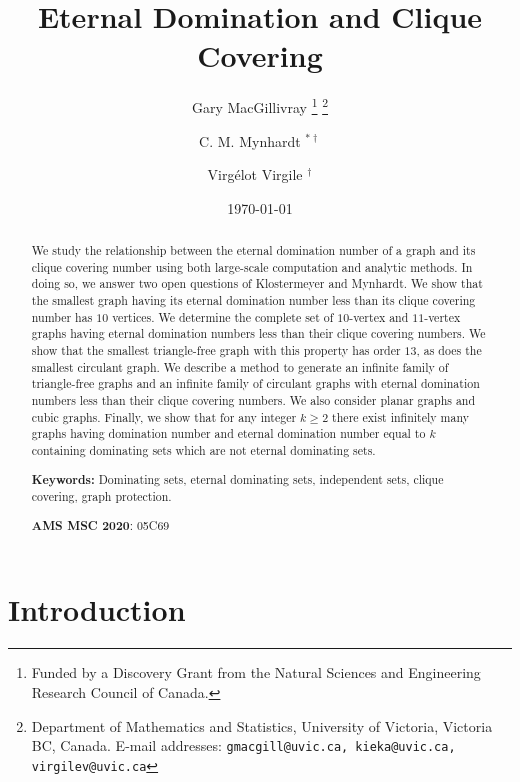 \documentclass[11pt]{article}
\title{Eternal Domination and Clique Covering}
\author{Gary MacGillivray \thanks{Funded by a Discovery Grant from the Natural Sciences and Engineering Research Council of Canada.} \thanks{Department of Mathematics and Statistics, University of Victoria, Victoria BC, Canada. \newline \indent \hspace{4pt} E-mail addresses: \texttt{gmacgill@uvic.ca, kieka@uvic.ca, virgilev@uvic.ca}} \and C. M. Mynhardt $^{* \dagger}$ \and Virgélot Virgile $^\dagger$}
\date{\today}
\begin{document}
\maketitle

\begin{abstract}
We study the relationship between the eternal domination number of a graph and its clique covering number using both large-scale computation and analytic methods. In doing so, we answer two open questions of Klostermeyer and Mynhardt. We show that the smallest graph having its eternal domination number less than its clique covering number has $10$ vertices. We determine the complete set of $10$-vertex and $11$-vertex graphs having eternal domination numbers less than their clique covering numbers. We show that the smallest triangle-free graph with this property has order $13$, as does the smallest circulant graph. We describe a method to generate an infinite family of triangle-free graphs and an infinite family of circulant graphs with eternal domination numbers less than their clique covering numbers. We also consider planar graphs and cubic graphs. Finally, we show that for any integer $k \geq 2$ there exist infinitely many graphs having domination number and eternal domination number equal to $k$ containing dominating sets which are not eternal dominating sets. \newline

\noindent \textbf{Keywords:} Dominating sets, eternal dominating sets, independent sets, clique covering, graph protection.\newline

\noindent \textbf{AMS MSC 2020}: 05C69

\end{abstract}


\section{Introduction}

\end{document}
